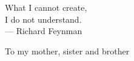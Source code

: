 \cleardoublepage
\thispagestyle{empty}


\vspace*{3cm}

\begin{raggedleft}
    	What I cannot create, \\
	I do not understand.\\
     --- Richard Feynman\\
\end{raggedleft}

\vspace{4cm}

\begin{center}
    To my mother, sister and brother
\end{center}


